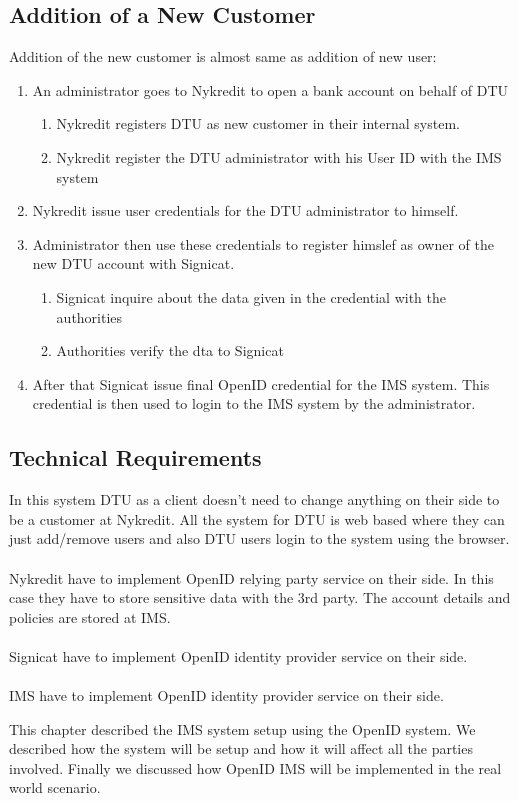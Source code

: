 \FloatBarrier
\subsection{Addition of a New Customer}
Addition of the new customer is almost same as addition of new user:
\begin{enumerate}
	\item An administrator goes to Nykredit to open a bank account on behalf of DTU 
	\begin{enumerate}
		\item Nykredit registers DTU as new customer in their internal system.
		\item Nykredit register the DTU administrator with his User ID with the IMS system
	\end{enumerate}
	\item Nykredit issue user credentials for the  DTU administrator to himself.
	\item Administrator then use these credentials to register himslef as owner of the new DTU account with Signicat. 
	\begin{enumerate}
		\item Signicat inquire about the data given in the credential with the authorities
		\item Authorities verify the dta to Signicat
	\end{enumerate}
	\item After that Signicat issue final OpenID credential for the IMS system. This credential is then used to login to the IMS system by the administrator.
\end{enumerate}
\subsection{Technical Requirements}
In this system DTU as a client doesn't need to change anything on their side to be a customer at Nykredit. All the system for DTU is web based where they can just add/remove users and also DTU users login to the system using the browser.
\\
\\Nykredit have to implement OpenID relying party service on their side. In this case they have to store sensitive data with the 3rd party. The account details and policies are stored at IMS.
\\
\\Signicat have to implement OpenID identity provider service on their side.
\\\\
IMS have to implement  OpenID identity provider service on their side.

This chapter described the IMS system setup using the OpenID system. We described how the system will be setup and how it will affect all the parties involved. Finally we discussed how OpenID IMS will be implemented in the real world scenario.

